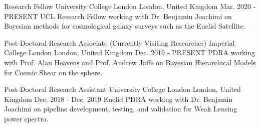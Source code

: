 

\begin{cventries}

  \cventry
    {Research Fellow} %
    {University College London} %
    {London, United Kingdom} %
    {Mar. 2020 - PRESENT} %
    {
    UCL Research Fellow working with Dr. Benjamin Joachimi on Bayesian methods for cosmological galaxy surveys such as the Euclid Satellite.
    }
    
 \cventry
    {Post-Doctoral Research Associate (Currently Visiting Researcher)} %
    {Imperial College London} %
    {London, United Kingdom} %
    {Dec. 2019 - PRESENT} %
    {
    PDRA working with Prof. Alan Heavens and Prof. Andrew Jaffe on Bayesian Hierarchical Models for Cosmic Shear on the sphere.
    }

  \cventry
    {Post-Doctoral Research Assistant} %
    {University College London} %
    {London, United Kingdom} %
    {Dec. 2018 - Dec. 2019} %
    {
    Euclid PDRA working with Dr. Benjamin Joachimi on pipeline development, testing, and validation for Weak Lensing power spectra.
    }


\end{cventries}

